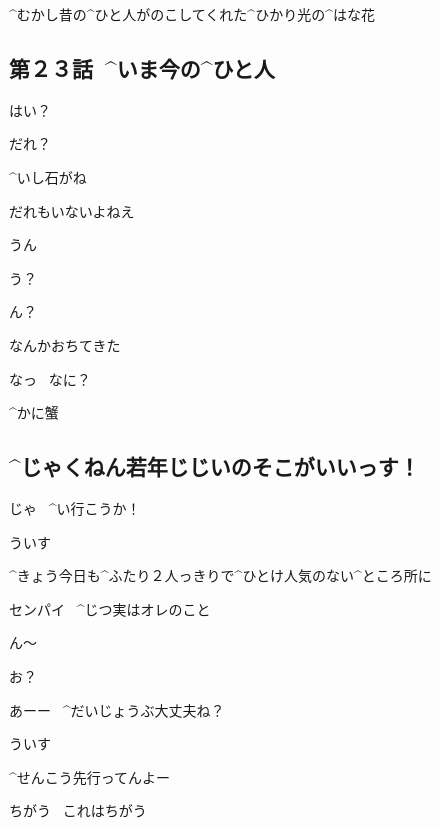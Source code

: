 \page[116]
\Sensei ^{むかし}{昔}の^{ひと}{人}がのこしてくれた^{ひかり}{光}の^{はな}{花}


\subsection{第２３話\ ^{いま}{今}の^{ひと}{人}}

\page[130]
\Alpha はい？

\Takahiro だれ？

\Alpha ^{いし}{石}がね

\Alpha だれもいないよねえ

\Takahiro うん

\page
\Takahiro う？

\Alpha ん？

\Takahiro なんかおちてきた

\Alpha なっ
\ なに？

\Takahiro ^{かに}{蟹}


\subsection{^{じゃくねん}{若年}じじいのそこがいいっす！}

\Sensei じゃ
\ ^{い}{行}こうか！

\Ojisan ういす

\Ojisan ^{きょう}{今日}も^{ふたり}{２人}っきりで^{ひとけ}{人気}のない^{ところ}{所}に

\Ojisan センパイ
\ ^{じつ}{実}はオレのこと

\Ojisan ん〜

\Ojisan お？

\Sensei あーー
\ ^{だいじょうぶ}{大丈夫}ね？

\Ojisan ういす

\Sensei ^{せんこう}{先行}ってんよー

\Ojisan ちがう
\ これはちがう
